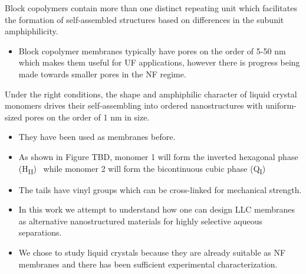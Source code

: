   Block copolymers contain more than one distinct repeating unit which facilitates 
  the formation of self-assembled structures based on differences in the subunit 
  amphiphilicity.~\cite{jackson_nanoporous_2010} 
  \begin{itemize}
    \item Block copolymer membranes typically have pores on the order of 5-50 nm which
    makes them useful for UF applications, however there is progress being made towards
    smaller pores in the NF regime.~\cite{gu_tailoring_2015}
  \end{itemize}
  
  Under the right conditions, the shape and amphiphilic character of liquid 
  crystal monomers drives their self-assembling into ordered nanostructures with
  uniform-sized pores on the order of 1 nm in size.~\cite{gin_polymerized_2008}
  \begin{itemize}
    \item They have been used as membranes before.~\cite{gin_polymerized_2001}
    \item As shown in Figure TBD, monomer 1 will form the inverted hexagonal phase 
    (H\textsubscript{II})~\cite{smith_ordered_1997} while monomer 2 will form the 
    bicontinuous cubic phase (Q\textsubscript{I})~\cite{carter_glycerol-based_2012}
    \item The tails have vinyl groups which can be cross-linked for mechanical strength.
    \item In this work we attempt to understand how one can design LLC membranes as 
    alternative nanostructured materials for highly selective aqueous separations.
    \item We chose to study liquid crystals because they are already suitable as NF 
    membranes and there has been sufficient experimental characterization.~\cite{gin_polymerized_2001,feng_scalable_2014,feng_thin_2016}
  \end{itemize}
   
